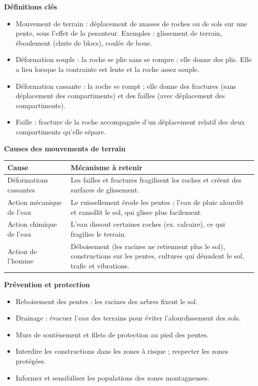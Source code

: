 \documentclass[11pt]{article}
\newcommand{\cle}[1]{{\popxbold\color{popdark}#1}}
\begin{document}
\begin{bilan}
\textbf{Définitions clés}
\begin{itemize}
  \item \cle{Mouvement de terrain} : déplacement de masses de roches ou de sols sur une pente, sous l'effet de la pesanteur. Exemples : \cle{glissement de terrain}, \cle{éboulement} (chute de blocs), \cle{coulée de boue}.
  \item \cle{Déformation souple} : la roche se plie sans se rompre ; elle donne des \cle{plis}. Elle a lieu lorsque la contrainte est lente et la roche assez souple.
  \item \cle{Déformation cassante} : la roche se rompt ; elle donne des \cle{fractures} (sans déplacement des compartiments) et des \cle{failles} (avec déplacement des compartiments).
  \item \cle{Faille} : fracture de la roche accompagnée d'un déplacement relatif des deux compartiments qu'elle sépare.
\end{itemize}

\textbf{Causes des mouvements de terrain}
\begin{center}
\begin{tabularx}{\linewidth}{|l|X|}
\hline
\rowcolor{popblueL} \textbf{Cause} & \textbf{Mécanisme à retenir} \\
\hline
Déformations cassantes & Les failles et fractures fragilisent les roches et créent des surfaces de glissement. \\
\hline
Action mécanique de l'eau & Le ruissellement érode les pentes ; l'eau de pluie alourdit et ramollit le sol, qui glisse plus facilement. \\
\hline
Action chimique de l'eau & L'eau dissout certaines roches (ex. calcaire), ce qui fragilise le terrain. \\
\hline
Action de l'homme & Déboisement (les racines ne retiennent plus le sol), constructions sur les pentes, cultures qui dénudent le sol, trafic et vibrations. \\
\hline
\end{tabularx}
\end{center}

\textbf{Prévention et protection}
\begin{itemize}
  \item \cle{Reboisement} des pentes : les racines des arbres fixent le sol.
  \item \cle{Drainage} : évacuer l'eau des terrains pour éviter l'alourdissement des sols.
  \item \cle{Murs de soutènement} et filets de protection au pied des pentes.
  \item Interdire les constructions dans les zones à risque ; respecter les zones protégées.
  \item Informer et sensibiliser les populations des zones montagneuses.
\end{itemize}


\end{bilan}
\end{document}
